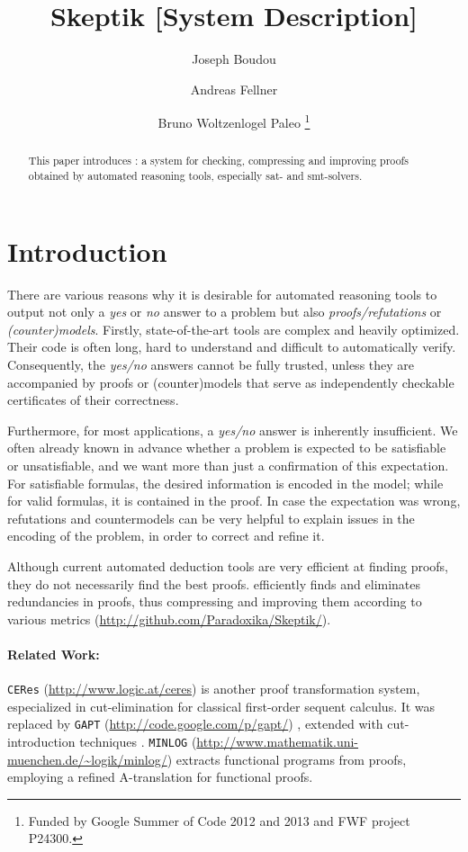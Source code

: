 \documentclass{llncs}
\title{ 
Skeptik [System Description]
}
\author{
  Joseph Boudou\inst{1}
  \and 
  Andreas Fellner\inst{2,3}
  \and 
  Bruno Woltzenlogel Paleo\inst{3}
  \thanks{Funded by Google Summer of Code 2012 and 2013 and FWF project P24300.}
}
\institute{
  IRIT, Universit\'e de Toulouse, France \\
  \email{joseph.boudou@irit.fr}
  \and 
  Free University of Bolzano, Italy \\
  \email{fellner.a@gmail.com}
  \and 
  Vienna University of Technology, Austria \\
  \email{bruno@logic.at}
}
\begin{document}
\maketitle


\begin{abstract}
This paper introduces \skeptik: a system for checking, compressing and improving proofs obtained by automated reasoning tools, especially sat- and smt-solvers.
\end{abstract}

\setcounter{footnote}{0}


\section{Introduction}

There are various reasons why it is desirable 
for automated reasoning
tools to output not only a \emph{yes} or \emph{no} answer to a problem 
but also \emph{proofs/refutations} or \emph{(counter)models}. 
%
Firstly, state-of-the-art tools are complex and heavily optimized. Their code is often long, hard to understand and difficult to automatically verify. Consequently, the \emph{yes/no} answers cannot be fully trusted, unless they are accompanied by proofs or (counter)models that serve as independently checkable certificates of 
their correctness. 

Furthermore, for most applications, a \emph{yes/no} answer is inherently insufficient. We often already known in advance whether a problem is expected to be satisfiable or unsatisfiable, and we want more than just a confirmation of this expectation. For satisfiable formulas, the desired information is encoded in the model; while for valid formulas, it is contained in the proof. In case the expectation was wrong, refutations and countermodels can be very helpful to explain issues in the encoding of the problem, in order to correct and refine it. 

Although current automated deduction tools are very efficient at finding proofs, they do not necessarily find the best proofs. {\skeptik} efficiently finds and eliminates redundancies in proofs, thus compressing and improving them according to various metrics (\url{http://github.com/Paradoxika/Skeptik/}).

\paragraph{Related Work:} \texttt{CERes} (\url{http://www.logic.at/ceres}) \cite{ToDo} is another proof transformation system, especialized in cut-elimination for classical first-order sequent calculus. It was replaced by \texttt{GAPT} (\url{http://code.google.com/p/gapt/}) \cite{ToDo}, extended with cut-introduction techniques \cite{ToDo}. \texttt{MINLOG} (\url{http://www.mathematik.uni-muenchen.de/~logik/minlog/}) \cite{ToDo} extracts functional programs from proofs, employing a refined A-translation for functional proofs.
\end{document}
